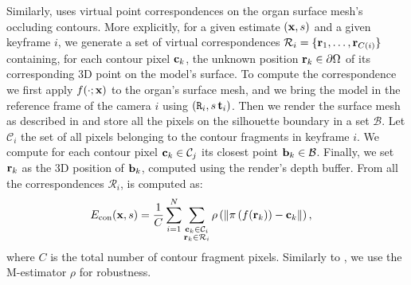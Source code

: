 Similarly, \Econtour uses virtual point correspondences on the organ surface mesh's occluding contours.
More explicitly, for a given estimate $(\mathbf{x},s)$ and a given keyframe $i$, we generate a set of virtual correspondences $\mathcal{R}_i=\{\mathbf{r}_1,\dots ,\mathbf{r}_{C(i)}\}$
containing, for each contour pixel $\mathbf{c}_k$, the unknown position $\mathbf{r}_k\in\partial \Omega$  of its corresponding 3D point on the model's surface.
To compute the correspondence we first apply $f(\cdot;\mathbf{x})$ to the organ's surface mesh, and we bring the model in the reference frame of the camera $i$ using $(\mat{R}_{i}, s\,\vet{t}_{i})$.
Then
we render the surface mesh as described in  and store all the pixels on the silhouette boundary in a set $\mathcal{B}$. 
Let $\mathcal{C}_i$  the set of all pixels belonging to the contour fragments in keyframe $i$.
We compute for each contour pixel $\mathbf{c}_k\in \mathcal{C}_j$ its closest point $\mathbf{b}_k\in \mathcal{B}$.
Finally, we set $\mathbf{r}_k$ as the 3D position of $\mathbf{b}_k$, computed using the render's depth buffer.
From all the correspondences $\mathcal{R}_i$, \Econtour is computed as:
\begin{equation}
\label{eq:contour}
\begin{split}
 & \Econtour(\vet{x},s) = \frac{1}{C}\sum_{i=1}^{N}\sum_{\substack{\vet{c}_{k}\in\mathcal{C}_{i}\\\vet{r}_{k}\in\mathcal{R}_{i}}}\rho\left(\|\pi\left(f(\vet{r}_{k})\right)-\vet{c}_{k}\|\right),
\end{split}
\end{equation}
\noindent where $C$ is the total number of contour fragment pixels.
Similarly to \Epoint, we use the M-estimator $\rho$ for robustness.

